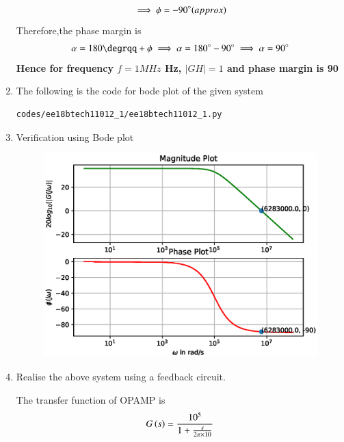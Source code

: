 \begin{enumerate}[label=\thesubsection.\arabic*.,ref=\thesubsection.\theenumi]
\begin{align}
\implies \phi = -90\degree (approx)
\end{align}
Therefore,the phase margin is
\begin{align}
    \alpha = 180\degrqq + \phi \implies \alpha = 180\degree - 90\degree\implies  \alpha = 90\degree
\end{align}
\textbf{Hence for frequency $f = 1 MHz$ Hz, $|GH| = 1$ and phase margin is 90\degree}
\item The following is the code for bode plot of the given system
\begin{lstlisting}
codes/ee18btech11012_1/ee18btech11012_1.py
\end{lstlisting}
\item Verification using Bode plot 
\begin{figure}[!h]
\centering
\includegraphics[width=\columnwidth]{./figs/ee18btech11012_1/ee18btech11012_1.eps}
\caption{}
\label{fig:ee18btech11012_1}
\end{figure}
\item Realise the above system using a feedback circuit.\\
\solution
\begin{figure}[ht!]
	\begin{center}
		\resizebox{\columnwidth/1}{!}{}
	\end{center}
	\caption{}
	\label{fig:ee18btech11012_fig1}
\end{figure}
The transfer function of OPAMP is
\begin{align}
    G\left(s\right) = \frac{10^{5}}{1+\frac{s}{2\pi \times 10}}
\end{align}

\end{enumerate}

